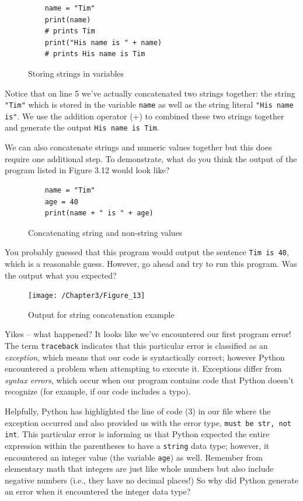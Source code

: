 \documentclass{book}
\begin{document}
\begin{figure}[h]
	\caption{Storing strings in variables}
	\begin{lstlisting}
	name = "Tim"
	print(name)
	# prints Tim
	print("His name is " + name)
	# prints His name is Tim
	\end{lstlisting}
\end{figure}

Notice that on line 5 we've actually concatenated two strings together: the string \texttt{"Tim"} which is stored in the variable \texttt{name} as well as the string literal \texttt{"His name is"}. We use the addition operator (+) to combined these two strings together and generate the output \texttt{His name is Tim}.

We can also concatenate strings and numeric values together but this does require one additional step. To demonstrate, what do you think the output of the program listed in Figure 3.12 would look like?

\begin{figure}[h]
	\caption{Concatenating string and non-string values}
	\begin{lstlisting}
	name = "Tim"
	age = 40
	print(name + " is " + age)
	\end{lstlisting}
\end{figure}

You probably guessed that this program would output the sentence \texttt{Tim is 40}, which is a reasonable guess. However, go ahead and try to run this program. Was the output what you expected? 

\begin{figure}[h]
	\caption{Output for string concatenation example}
	\centering\texttt{[image: /Chapter3/Figure\_13]}
\end{figure}

Yikes -- what happened? It looks like we've encountered our first program error! The term \texttt{traceback} indicates that this particular error is classified as an \textit{exception}, which means that our code is syntactically correct; however Python encountered a problem when attempting to execute it. Exceptions differ from \textit{syntax errors}, which occur when our program contains code that Python doesn't recognize (for example, if our code includes a typo).

Helpfully, Python has highlighted the line of code (3) in our file where the exception occurred and also provided us with the error type, \texttt{must be str, not int}. This particular error is informing us that Python expected the entire expression within the parentheses to have a \texttt{string} data type; however, it encountered an integer value (the variable \texttt{age}) as well. Remember from elementary math that integers are just like whole numbers but also include negative numbers (i.e., they have no decimal places!) So why did Python generate an error when it encountered the integer data type?
\end{document}
